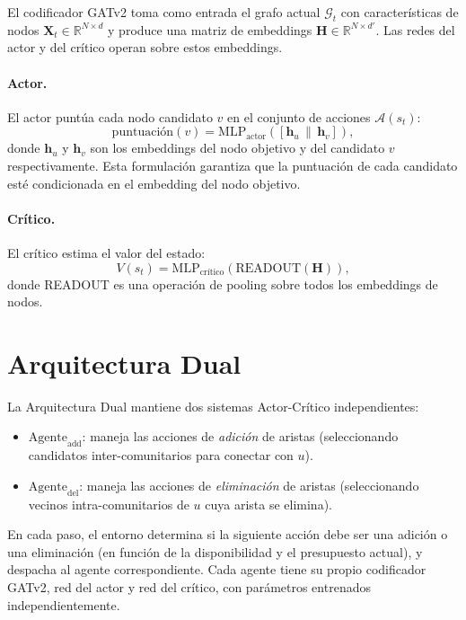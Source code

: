 \documentclass[11pt,a4paper,twoside]{tesis}
\newcommand{\G}{\mathcal{G}}
\begin{document}
El codificador GATv2 toma como entrada el grafo actual $\G_t$ con características de
nodos $\mathbf{X}_t \in \mathbb{R}^{N \times d}$ y produce una matriz de embeddings
$\mathbf{H} \in \mathbb{R}^{N \times d'}$. Las redes del actor y del crítico operan
sobre estos embeddings.

\paragraph{Actor.}
El actor puntúa cada nodo candidato $v$ en el conjunto de acciones $\mathcal{A}(s_t)$:
\[
\mathrm{puntuación}(v) = \mathrm{MLP}_{\mathrm{actor}}\!\left(\left[\mathbf{h}_u \,\|\, \mathbf{h}_v\right]\right),
\]
donde $\mathbf{h}_u$ y $\mathbf{h}_v$ son los embeddings del nodo objetivo y del
candidato $v$ respectivamente. Esta formulación garantiza que la puntuación de cada
candidato esté condicionada en el embedding del nodo objetivo.

\paragraph{Crítico.}
El crítico estima el valor del estado:
\[
V(s_t) = \mathrm{MLP}_{\mathrm{crítico}}\!\left(\mathrm{READOUT}(\mathbf{H})\right),
\]
donde READOUT es una operación de pooling sobre todos los embeddings de nodos.

\section{Arquitectura Dual}
\label{sec:dual}

La Arquitectura Dual mantiene dos sistemas Actor-Crítico independientes:
\begin{itemize}
    \item $\mathrm{Agente}_{\mathrm{add}}$: maneja las acciones de \emph{adición} de
      aristas (seleccionando candidatos inter-comunitarios para conectar con $u$).
    \item $\mathrm{Agente}_{\mathrm{del}}$: maneja las acciones de \emph{eliminación}
      de aristas (seleccionando vecinos intra-comunitarios de $u$ cuya arista se elimina).
\end{itemize}

En cada paso, el entorno determina si la siguiente acción debe ser una adición o una
eliminación (en función de la disponibilidad y el presupuesto actual), y despacha al
agente correspondiente. Cada agente tiene su propio codificador GATv2, red del actor y
red del crítico, con parámetros entrenados independientemente.
\end{document}
